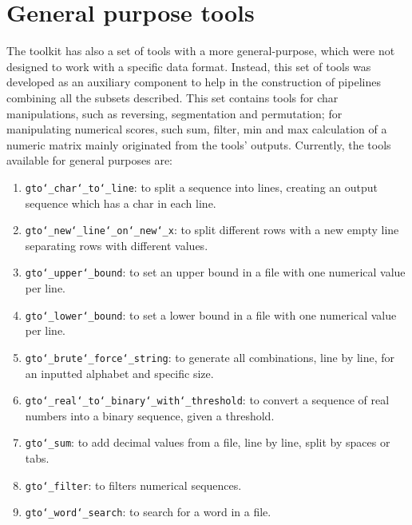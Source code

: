 \chapter{General purpose tools}
\label{seq}
The toolkit has also a set of tools with a more general-purpose, which were not designed to work with a specific data format. Instead, this set of tools was developed as an auxiliary component to help in the construction of pipelines combining all the subsets described. This set contains tools for char manipulations, such as reversing, segmentation and permutation; for manipulating numerical scores, such sum, filter, min and max calculation of a numeric matrix mainly originated from the tools' outputs. Currently, the tools available for general purposes are:
\begin{enumerate}

\item \texttt{gto\char`_char\char`_to\char`_line}: to split a sequence into lines, creating an output sequence which has a char in each line.

\item \texttt{gto\char`_new\char`_line\char`_on\char`_new\char`_x}: to split different rows with a new empty line separating rows with different values.

\item \texttt{gto\char`_upper\char`_bound}: to set an upper bound in a file with one numerical value per line.

\item \texttt{gto\char`_lower\char`_bound}: to set a lower bound in a file with one numerical value per line.

\item \texttt{gto\char`_brute\char`_force\char`_string}: to generate all combinations, line by line, for an inputted alphabet and specific size.

\item \texttt{gto\char`_real\char`_to\char`_binary\char`_with\char`_threshold}: to convert a sequence of real numbers into a binary sequence, given a threshold.

\item \texttt{gto\char`_sum}: to add decimal values from a file, line by line, split by spaces or tabs.

\item \texttt{gto\char`_filter}: to filters numerical sequences.

\item \texttt{gto\char`_word\char`_search}: to search for a word in a file.


\end{enumerate}
